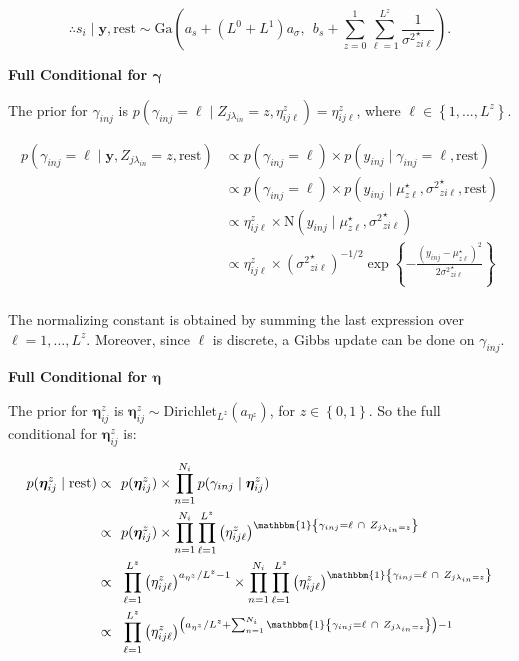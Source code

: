 \documentclass[12pt,]{article}
\newcommand{\p}[1]{\left(#1\right)}
\newcommand{\bc}[1]{ \left\{#1\right\} }
\newcommand{\N}{ \mathcal{N} }
\def\N{\text{N}}
\def\G{\text{Ga}}
\def\Dir{\text{Dirichlet}}
\def\lin{\lambda_{in}}
\def\y{\bm{y}}
\def\mus{\mu^\star}
\def\sss{{\sigma^2}^\star}
\newcommand{\Ind}[1]{\mathbbm{1}\bc{#1}}
\def\rest{\text{rest}}
\begin{document}
\[
\therefore s_i \mid \y, \rest \sim 
\G\p{a_s + (L^0 + L^1)a_\sigma, ~~ b_s + \sum_{z=0}^1 \sum_{\ell=1}^{L^z}
\frac{1}{\sss_{zi\ell}} }.
\]
\vspace{2em}


\textbf{Full Conditional for $\bm\gamma$}

The prior for \(\gamma_{inj}\) is
\(p(\gamma_{inj} = \ell \mid Z_{j\lin}=z, \eta^z_{ij\ell}) = \eta^z_{ij\ell}\),
where \(\ell \in \bc{1,...,L^z}\).

\begin{align*}
p(\gamma_{inj}=\ell \mid \y, Z_{j\lin}=z, \rest) &\propto p(\gamma_{inj}=\ell)
  \times p(y_{inj} \mid \gamma_{inj}=\ell, \rest) \\
&\propto p(\gamma_{inj}=\ell) \times p(y_{inj} \mid \mus_{z\ell},
  \sss_{zi\ell}, \rest) \\
%
&\propto \eta^z_{ij\ell} \times \N(y_{inj} \mid \mus_{z\ell}, \sss_{zi\ell}) \\
&\propto \eta^z_{ij\ell} \times (\sss_{zi\ell})^{-1/2}
\exp\bc{-\frac{(y_{inj} - \mus_{z\ell})^2}{2\sss_{zi\ell}}} \\
\end{align*}

The normalizing constant is obtained by summing the last expression over
\(\ell = 1,...,L^z\). Moreover, since \(\ell\) is discrete, a Gibbs
update can be done on \(\gamma_{inj}\).
\vspace{2em}


\textbf{Full Conditional for $\bm\eta$}

The prior for \(\bm\eta^z_{ij}\) is
\(\bm \eta^z_{ij} \sim \Dir_{L^z}(a_{\eta^z})\), for \(z\in\bc{0,1}\).
So the full conditional for \(\bm\eta^z_{ij}\) is:

\begin{align*}
p(\bm \eta^z_{ij} \mid \rest) \propto&~~ p(\bm{\eta}^z_{ij}) \times
  \prod_{n=1}^{N_i} p(\gamma_{inj} \mid \bm \eta^z_{ij})\\
\propto&~~ p(\bm \eta^z_{ij}) \times \prod_{n=1}^{N_i}\prod_{\ell=1}^{L^z}
  \p{\eta^z_{ij\ell}}^{\Ind{ \gamma_{inj}=\ell ~\cap~ Z_{j\lin=z}}}\\
%
\propto&~~ \prod_{\ell=1}^{L^z} \p{\eta^z_{ij\ell}}^{a_{\eta^z}/L^z-1} \times 
\prod_{n=1}^{N_i}\prod_{\ell=1}^{L^z} \p{\eta^z_{ij\ell}}^{\Ind{
\gamma_{inj}=\ell ~\cap~ Z_{j\lin=z}}}\\
\propto&~~ \prod_{\ell=1}^{L^z} \p{\eta^z_{ij\ell}}^{\p{a_{\eta^z} / L^z +
\sum_{n=1}^{N_i} \Ind{ \gamma_{inj}=\ell ~\cap~ Z_{j\lin=z}}} - 1}\\
%
\end{align*}
\end{document}
